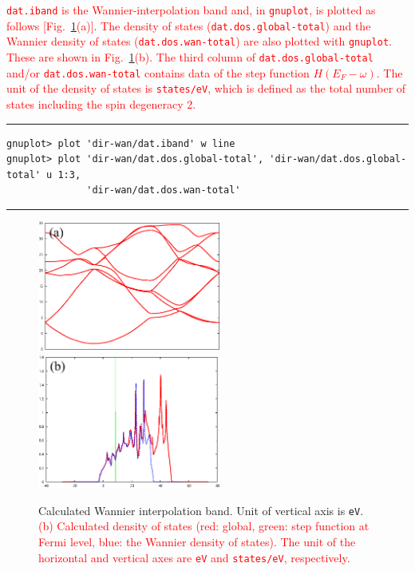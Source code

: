 \documentclass{article}
\newcommand{\tr}[1]{\textcolor{red}{#1}}
\begin{document}
\tr{{\tt dat.iband} is the Wannier-interpolation band and, in {\tt gnuplot}, is plotted as follows [Fig.~\ref{iband}(a)]. The density of states ({\tt dat.dos.global-total}) and the Wannier density of states ({\tt dat.dos.wan-total}) are also plotted with {\tt gnuplot}. These are shown in Fig.~\ref{iband}(b). The third column of {\tt dat.dos.global-total} and/or {\tt dat.dos.wan-total} contains data of the step function $H(E_F-\omega)$. The unit of the density of states is {\tt states/eV}, which is defined as the total number of states including the spin degeneracy 2.}
\vspace{3mm}\hrule
\begin{verbatim}
gnuplot> plot 'dir-wan/dat.iband' w line 
gnuplot> plot 'dir-wan/dat.dos.global-total', 'dir-wan/dat.dos.global-total' u 1:3, 
              'dir-wan/dat.dos.wan-total'
\end{verbatim}
\hrule\vspace{3mm}
\begin{figure}[H] 
\centering
\includegraphics[width=6cm]{dat.iband-Al.eps}
\includegraphics[width=6cm]{dat.dos-Al.eps}
\caption{Calculated Wannier interpolation band. Unit of vertical axis is {\tt eV}. \tr{(b) Calculated density of states (red: global, green: step function at Fermi level, blue: the Wannier density of states). The unit of the horizontal and vertical axes are {\tt eV} and {\tt states/eV}, respectively.}} 
\label{iband}
\end{figure}
\end{document}
